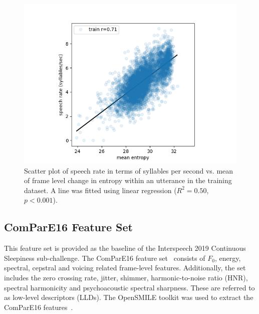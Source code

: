 \begin{figure}
    \centering
    \includegraphics[width=\linewidth]{IS2019_paper_kit/images/scatter_train.png}
    \caption{\label{fig:entropy_rate}Scatter plot of speech rate in terms of syllables per second vs. mean of frame level change in entropy within an utterance in the training dataset. A line was fitted using linear regression ($R^2=0.50$, $p<0.001$).}
\end{figure}

\subsection{ComParE16 Feature Set}

This feature set is provided as the baseline of the Interspeech 2019 Continuous Sleepiness sub-challenge. The ComParE16 feature set~\cite{weninger2013acoustics} consists of $F_0$, energy, spectral, cepstral and voicing related frame-level features. Additionally, the set includes the zero crossing rate, jitter, shimmer, harmonic-to-noise ratio (HNR), spectral harmonicity and psychoacoustic spectral sharpness. These are referred to as low-level descriptors (LLDs). The OpenSMILE toolkit was used to extract the ComParE16 features~\cite{eyben2010opensmile}.



